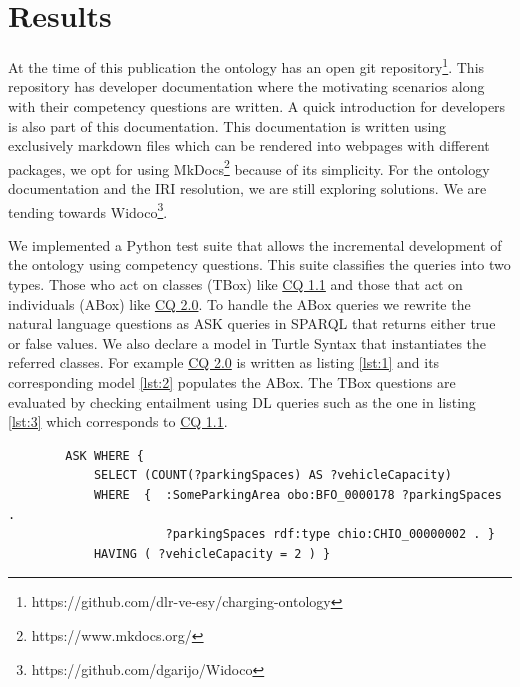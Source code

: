\section{Results}
\label{results}

At the time of this publication the ontology has an open git
repository\footnote{https://github.com/dlr-ve-esy/charging-ontology}. This
repository has developer documentation where the motivating scenarios along
with their competency questions are written. A quick introduction for
developers is also part of this documentation. This documentation is written
using exclusively markdown files which can be rendered into webpages with
different packages, we opt for using MkDocs\footnote{https://www.mkdocs.org/}
because of its simplicity. For the ontology documentation and the IRI
resolution, we are still exploring solutions. We are tending towards
Widoco\footnote{https://github.com/dgarijo/Widoco}.

We implemented a Python test suite that allows the incremental development of
the ontology using competency questions. This suite classifies the queries into
two types. Those who act on classes (TBox) like \hyperref[CQ1.1]{CQ 1.1} and
those that act on individuals (ABox) like \hyperref[CQ2.0]{CQ 2.0}. To handle
the ABox queries we rewrite the natural language questions as ASK queries in
SPARQL  that returns either true or false values. We also declare a model in
Turtle Syntax that instantiates the referred classes. For example
\hyperref[CQ2.0]{CQ 2.0} is written as listing \ref{lst:1} and its corresponding
model \ref{lst:2} populates the ABox. The TBox questions are evaluated by
checking entailment using DL queries such as the one in listing \ref{lst:3}
which corresponds to \hyperref[CQ1.1]{CQ 1.1}.

\begin{listing}[h]
    
    \begin{verbatim}
        ASK WHERE {
            SELECT (COUNT(?parkingSpaces) AS ?vehicleCapacity)  
            WHERE  {  :SomeParkingArea obo:BFO_0000178 ?parkingSpaces . 
                      ?parkingSpaces rdf:type chio:CHIO_00000002 . }
            HAVING ( ?vehicleCapacity = 2 ) }
    \end{verbatim}
    \caption{Example ABox query. (Given a parking area with two parking places) What is the (vehicle) capacity of parking lot P? (2). The namespaces are omitted.}
    \label{lst:1}
\end{listing}

